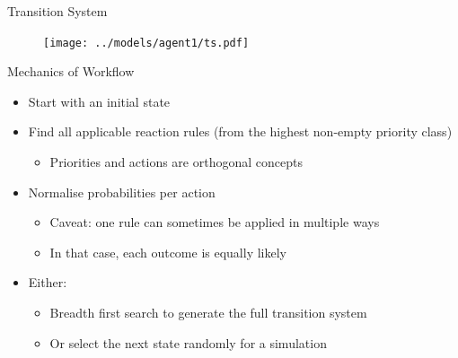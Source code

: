 \documentclass{beamer}
\begin{document}
\begin{frame}{Transition System}
  \begin{figure}
    \centering
    \texttt{[image: ../models/agent1/ts.pdf]}
  \end{figure}
\end{frame}

\begin{frame}{Mechanics of Workflow}
  \begin{itemize}
  \item Start with an initial state
    \pause
  \item Find all applicable reaction rules (from the highest non-empty priority
    class)
    \begin{itemize}
    \item Priorities and actions are orthogonal concepts
    \end{itemize}
    \pause
  \item Normalise probabilities per action
    \pause
    \begin{itemize}
    \item Caveat: one rule can sometimes be applied in multiple ways
    \item In that case, each outcome is equally likely
    \end{itemize}
    \pause
  \item Either:
    \begin{itemize}
    \item Breadth first search to generate the full transition system
    \item Or select the next state randomly for a simulation
    \end{itemize}
  \end{itemize}
\end{frame}
\end{document}
